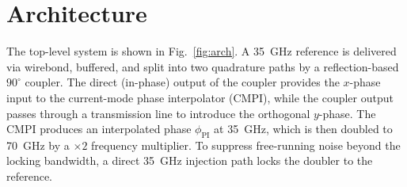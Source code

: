 \section{Architecture}
\label{sec:architecture}

The top-level system is shown in Fig.~\ref{fig:arch}. A \SI{35}{\giga\hertz}
reference is delivered via wirebond, buffered, and split into two quadrature
paths by a reflection-based $90^\circ$ coupler. The direct (in-phase) output
of the coupler provides the $x$-phase input to the current-mode phase
interpolator (CMPI), while the coupler output passes through a transmission
line to introduce the orthogonal $y$-phase. The CMPI produces an interpolated
phase $\phi_\mathrm{PI}$ at \SI{35}{\giga\hertz}, which is then doubled to
\SI{70}{\giga\hertz} by a $\times 2$ frequency multiplier. To suppress
free-running noise beyond the locking bandwidth, a direct \SI{35}{\giga\hertz}
injection path locks the doubler to the reference.

